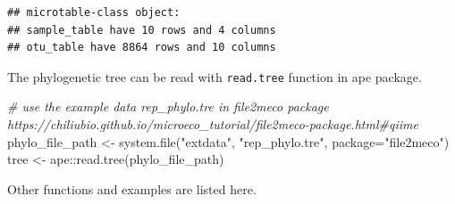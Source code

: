 \documentclass[
]{book}
\newenvironment{Shaded}{\begin{snugshade}}{\end{snugshade}}
\newcommand{\AttributeTok}[1]{\textcolor[rgb]{0.77,0.63,0.00}{#1}}
\newcommand{\CommentTok}[1]{\textcolor[rgb]{0.56,0.35,0.01}{\textit{#1}}}
\newcommand{\FunctionTok}[1]{\textcolor[rgb]{0.00,0.00,0.00}{#1}}
\newcommand{\NormalTok}[1]{#1}
\newcommand{\OtherTok}[1]{\textcolor[rgb]{0.56,0.35,0.01}{#1}}
\newcommand{\SpecialCharTok}[1]{\textcolor[rgb]{0.00,0.00,0.00}{#1}}
\newcommand{\StringTok}[1]{\textcolor[rgb]{0.31,0.60,0.02}{#1}}
\begin{document}
\begin{verbatim}
## microtable-class object:
## sample_table have 10 rows and 4 columns
## otu_table have 8864 rows and 10 columns
\end{verbatim}

The phylogenetic tree can be read with \texttt{read.tree} function in ape package.

\begin{Shaded}
\begin{Highlighting}[]
\CommentTok{\# use the example data rep\_phylo.tre in file2meco package https://chiliubio.github.io/microeco\_tutorial/file2meco{-}package.html\#qiime}
\NormalTok{phylo\_file\_path }\OtherTok{\textless{}{-}} \FunctionTok{system.file}\NormalTok{(}\StringTok{"extdata"}\NormalTok{, }\StringTok{"rep\_phylo.tre"}\NormalTok{, }\AttributeTok{package=}\StringTok{"file2meco"}\NormalTok{)}
\NormalTok{tree }\OtherTok{\textless{}{-}}\NormalTok{ ape}\SpecialCharTok{::}\FunctionTok{read.tree}\NormalTok{(phylo\_file\_path)}
\end{Highlighting}
\end{Shaded}

Other functions and examples are listed here.
\end{document}
